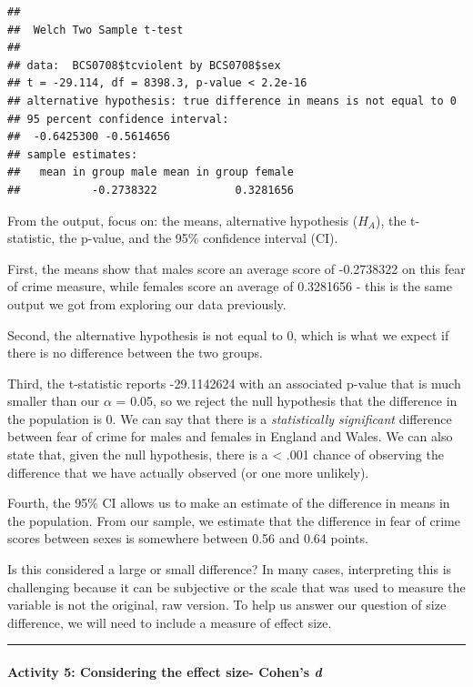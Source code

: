 \documentclass[
]{book}
\begin{document}
\begin{verbatim}
## 
##  Welch Two Sample t-test
## 
## data:  BCS0708$tcviolent by BCS0708$sex
## t = -29.114, df = 8398.3, p-value < 2.2e-16
## alternative hypothesis: true difference in means is not equal to 0
## 95 percent confidence interval:
##  -0.6425300 -0.5614656
## sample estimates:
##   mean in group male mean in group female 
##           -0.2738322            0.3281656
\end{verbatim}

From the output, focus on: the means, alternative hypothesis (\(H_A\)), the t-statistic, the p-value, and the 95\% confidence interval (CI).

First, the means show that males score an average score of -0.2738322 on this fear of crime measure, while females score an average of 0.3281656 - this is the same output we got from exploring our data previously.

Second, the alternative hypothesis is not equal to 0, which is what we expect if there is no difference between the two groups.

Third, the t-statistic reports -29.1142624 with an associated p-value that is much smaller than our \(\alpha\) = 0.05, so we reject the null hypothesis that the difference in the population is 0. We can say that there is a \emph{statistically significant} difference between fear of crime for males and females in England and Wales. We can also state that, given the null hypothesis, there is a \textless{} .001 chance of observing the difference that we have actually observed (or one more unlikely).

Fourth, the 95\% CI allows us to make an estimate of the difference in means in the population. From our sample, we estimate that the difference in fear of crime scores between sexes is somewhere between 0.56 and 0.64 points.

Is this considered a large or small difference? In many cases, interpreting this is challenging because it can be subjective or the scale that was used to measure the variable is not the original, raw version. To help us answer our question of size difference, we will need to include a measure of effect size.

\begin{center}\rule{0.5\linewidth}{0.5pt}\end{center}

\hypertarget{activity-5-considering-the-effect-size--cohens-d}{%
\paragraph{\texorpdfstring{Activity 5: Considering the effect size- Cohen's \emph{d}}{Activity 5: Considering the effect size- Cohen's d}}\label{activity-5-considering-the-effect-size--cohens-d}}
\end{document}
